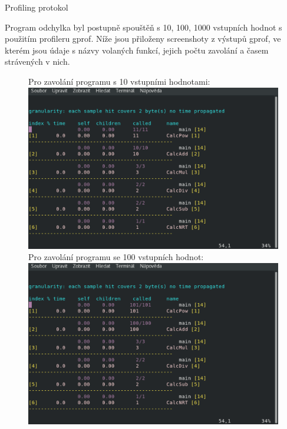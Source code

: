 \documentclass[a4paper, 11pt]{article}
\begin{document}
\begin{center}
\LARGE{Profiling protokol\\}
\end{center}

Program odchylka byl postupně spouštěň s 10, 100, 1000 vstupních hodnot s použitím profileru gprof. Níže jsou přiloženy screenshoty z výstupů gprof, ve kterém jsou údaje s názvy volaných funkcí, jejich počtu zavolání a časem strávených v nich.

\begin{figure}[h]
\centering
Pro zavolání programu s 10 vstupními hodnotami:\\
\includegraphics[scale=0.5]{10}\bigskip\\
Pro zavolání programu se 100 vstupních hodnot:\\
\includegraphics[scale=0.5]{100}\bigskip
\end{figure}
\end{document}
